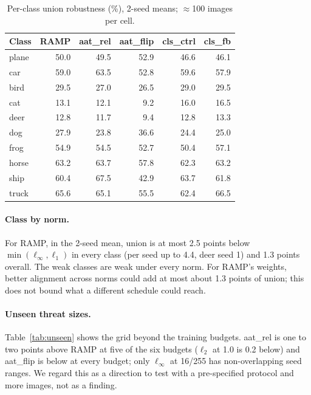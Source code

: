 \documentclass[11pt]{article}
\begin{document}
\begin{table}[h]\centering\caption{Per-class union robustness (\%), 2-seed means; $\approx$100 images per cell.}
\begin{tabular}{lrrrrr}\toprule
Class & RAMP & aat\_rel & aat\_flip & cls\_ctrl & cls\_fb \\\midrule
plane & 50.0 & 49.5 & 52.9 & 46.6 & 46.1 \\
car & 59.0 & 63.5 & 52.8 & 59.6 & 57.9 \\
bird & 29.5 & 27.0 & 26.5 & 29.0 & 29.5 \\
cat & 13.1 & 12.1 & 9.2 & 16.0 & 16.5 \\
deer & 12.8 & 11.7 & 9.4 & 12.8 & 13.3 \\
dog & 27.9 & 23.8 & 36.6 & 24.4 & 25.0 \\
frog & 54.9 & 54.5 & 52.7 & 50.4 & 57.1 \\
horse & 63.2 & 63.7 & 57.8 & 62.3 & 63.2 \\
ship & 60.4 & 67.5 & 42.9 & 63.7 & 61.8 \\
truck & 65.6 & 65.1 & 55.5 & 62.4 & 66.5 \\
\bottomrule\end{tabular}
\end{table}

\paragraph{Class by norm.} For RAMP, in the 2-seed mean, union is at most 2.5 points below $\min(\ell_\infty,\ell_1)$ in every
class (per seed up to 4.4, deer seed 1) and 1.3 points overall. The weak classes are weak under every norm. For RAMP's weights,
better alignment across norms could add at most about 1.3 points of union; this does not bound what a different schedule could reach.

\paragraph{Unseen threat sizes.} Table~\ref{tab:unseen} shows the grid beyond the training budgets. aat\_rel is one to two points above
RAMP at five of the six budgets ($\ell_2$ at 1.0 is 0.2 below) and aat\_flip is below at every budget; only $\ell_\infty$ at 16/255 has non-overlapping seed ranges.
We regard this as a direction to test with a pre-specified protocol and more images, not as a finding.
\end{document}
